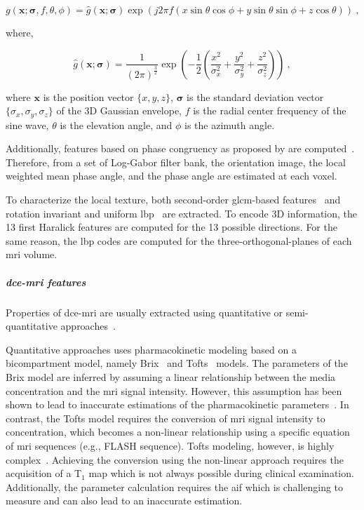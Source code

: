 \documentclass[a4paper,num-refs]{wiley-article}
\begin{document}
\begin{equation}
  g(\mathbf{x};\boldsymbol{\sigma},f,\theta,\phi) = \hat{g}(\mathbf{x};\boldsymbol{\sigma}) \exp(j 2 \pi f \left( x \sin \theta \cos \phi + y \sin \theta \sin \phi + z \cos \theta \right)) \ ,
  \label{eq:gabor3d}
\end{equation}

\noindent where,

\begin{equation}
  \hat{g}(\mathbf{x};\boldsymbol{\sigma}) = \frac{1}{{\left(2 \pi\right)}^{\frac{3}{2}}} \exp \left( -\frac{1}{2} \left( \frac{x^2}{\sigma_x^2} + \frac{y^2}{\sigma_y^2} + \frac{z^2}{\sigma_z^2} \right) \right) \ ,
  \label{eq:gabor3dgaussian}
\end{equation}

\noindent where $\mathbf{x}$ is the position vector $\{x,y,z\}$,
$\boldsymbol{\sigma}$ is the standard deviation vector
$\{\sigma_x,\sigma_y,\sigma_z\}$ of the 3D Gaussian envelope, $f$ is the radial
center frequency of the sine wave, $\theta$ is the elevation angle, and $\phi$
is the azimuth angle.

Additionally, features based on phase congruency as proposed by
\citeauthor{kovesi1999image} are computed~\cite{kovesi1999image}. Therefore,
from a set of Log-Gabor filter bank, the orientation image, the local weighted
mean phase angle, and the phase angle are estimated at each voxel.

To characterize the local texture, both second-order \ac{glcm}-based
features~\cite{Haralick1973} and rotation invariant and uniform
\ac{lbp}~\cite{ojala2002multiresolution} are extracted. To encode 3D
information, the 13 first Haralick features are computed for the 13 possible
directions. For the same reason, the \ac{lbp} codes are computed for the
three-orthogonal-planes of each \ac{mri} volume.

\subparagraph{\ac{dce}-\ac{mri} features}

Properties of \ac{dce}-\ac{mri} are usually extracted using quantitative or
semi-quantitative approaches~\cite{lemaitre2015computer}.

Quantitative approaches uses pharmacokinetic modeling based on a
bicompartment model, namely Brix~\cite{brix1991pharmacokinetic} and
Tofts~\cite{tofts1995quantitative} models. The parameters of the Brix model
are inferred by assuming a linear relationship between the media concentration
and the \ac{mri} signal intensity. However, this assumption has been shown to
lead to inaccurate estimations of the pharmacokinetic
parameters~\cite{heilmann2006determination}. In contrast, the Tofts model
requires the conversion of \ac{mri} signal intensity to concentration, which
becomes a non-linear relationship using a specific equation of \ac{mri}
sequences (e.g., FLASH sequence). Tofts modeling, however, is highly
complex~\cite{gliozzi2011phenomenological}. Achieving the conversion using the
non-linear approach requires the acquisition of a T$_1$ map which is not always
possible during clinical examination. Additionally, the parameter calculation
requires the \ac{aif} which is challenging to measure and can also lead to an
inaccurate estimation.
\end{document}
